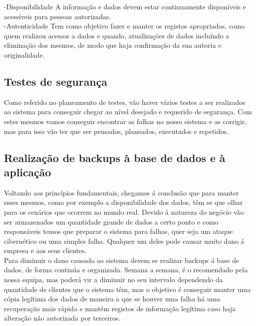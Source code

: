 -Disponibilidade
A informação e dados devem estar continuamente disponíveis e acessíveis para pessoas autorizadas.\\

-Autenticidade
Tem como objetivo fazer e manter os registos apropriados, como quem realizou acessos a dados e quando, atualizações de dados incluíndo a eliminação dos mesmos, de modo que haja confirmação da sua autoria e originalidade.


\subsection{Testes de segurança}
Como referido no planeamento de testes, vão haver vários testes a ser realizados ao sistema para conseguir chegar ao nível desejado e requerido de segurança. Com estes mesmos vamos conseguir encontrar as falhas no nosso sistema e as corrigir, mas para isso vão ter que ser pensados, planeados, executados e repetidos.\\

\subsection{Realização de backups à base de dados e à aplicação}
Voltando aos princípios fundamentais, chegamos á conclusão que para manter esses mesmos, como por exemplo a disponibilidade dos dados, têm se que olhar para os cenários que ocorrem no mundo real. Devido á natureza do negócio vão ser armazenados um quantidade grande de dados a certo ponto e como responsáveis temos que preparar o sistema para falhas, quer seja um ataque cibernético ou uma simples falha. Qualquer um deles pode causar muito dano á empresa e aos seus clientes.\\
Para diminuir o dano causado ao sistema devem se realizar backups á base de dados, de forma continúa e organizada. Semana a semana, é o recomendado pela nossa equipa, mas poderá vir a diminuir no seu intervalo dependendo da quantidade de clientes que o sistema têm, mas o objetivo é conseguir manter uma cópia legítima dos dados de maneira a que se houver uma falha há uma recuperação mais rápida e mantém registos de informação legítima caso haja alteração não autorizada por terceiros.